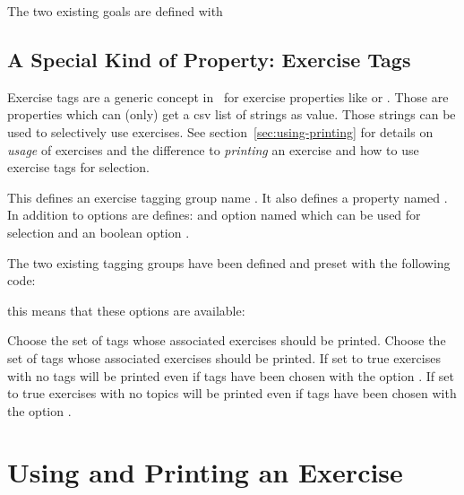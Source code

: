 \documentclass[load-preamble+]{cnltx-doc}
\begin{document}
The two existing goals are defined with
\begin{sourcecode}
\end{sourcecode}

\subsection{A Special Kind of Property: Exercise Tags}

Exercise tags are a generic concept in \xsim\ for exercise properties like
 or .  Those are properties which can (only)
get a csv list of strings as value.  Those strings can be used to selectively
use exercises.  See section~\vref{sec:using-printing} for details on
\emph{usage} of exercises and the difference to \emph{printing} an exercise
and how to use exercise tags for selection.
\begin{commands}
    This defines an exercise tagging group name .  It also defines a
    property named .  In addition to options are defines: and option
    named  which can be used for selection and an boolean
    option .
\end{commands}
The two existing tagging groups have been defined and preset with the
following code:
\begin{sourcecode}
\end{sourcecode}
this means that these options are available:
\begin{options}
    Choose the set of tags whose associated exercises should be printed.
    Choose the set of tags whose associated exercises should be printed.
    If set to true exercises with no tags will be printed even if tags have
    been chosen with the option .
    If set to true exercises with no topics will be printed even if tags have
    been chosen with the option .
\end{options}

\section{Using and Printing an Exercise}\label{sec:using-printing}
\end{document}
